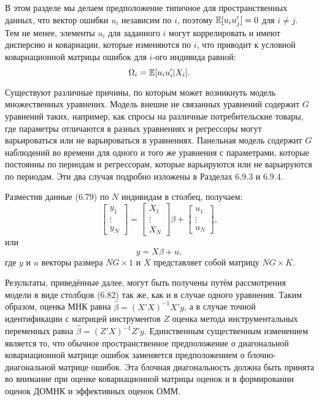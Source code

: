В этом разделе мы делаем предположение типичное для пространственных данных, что вектор ошибки $u_i$ независим по $i$, поэтому $\mathbb{E}[u_i u'_j]=0$ для $i \not = j$. Тем не менее, элементы $u_i$ для заданного $i$ могут коррелировать и имеют дисперсию и ковариации, которые изменяются по $i$, что приводит к условной ковариационной матрицы ошибок для $i$-ого индивида равной:
\begin{equation}
\Omega_i=\mathbb{E}[u_i u'_i|X_i].
\end{equation}

Существуют различные причины, по которым может возникнуть модель множественных уравнених. Модель внешне не связанных уравнений содержит $G$ уравнений таких, например, как спросы на различные потребительские товары, где параметры отличаются в разных уравнениях и регрессоры могут варьироваться или не варьироваться в уравнениях. Панельная модель содержит $G$ наблюдений во времени для одного и того же уравнения с параметрами, которые постоянны по периодам и регрессорам, которые варьируются или не варьируются по периодам. Эти два случая подробно изложены в Разделах 6.9.3 и 6.9.4.

Разместив данные (6.79)  по $N$ индивидам в столбец, получаем:
\begin{equation}
\begin{bmatrix} y_1 \\  \vdots \\ y_N \end{bmatrix} = \begin{bmatrix} X_1 \\  \vdots \\ X_N \end{bmatrix} \beta + \begin{bmatrix} u_1 \\  \vdots \\ u_N \end{bmatrix},
\end{equation}
или
\begin{equation}
y=X \beta + u,
\end{equation}
где $y$ и $u$ векторы размера $NG \times 1$ и $X$ представляет собой матрицу $NG \times K$.

Результаты, приведённые далее, могут быть получены путём рассмотрения модели в виде столбцов
(6.82) так же, как и в случае одного уравнения. Таким образом, оценка МНК равна $\hat{\beta}=(X'X)^{-1}X'y$, а в случае точной идентификации с матрицей инструментов $Z$ оценка метода инструментальных переменных равна $\hat{\beta}=(Z'X)^{-1}Z'y$. Единственным существенным изменением является то, что обычное пространственное предположение о диагональной ковариационной матрице ошибок заменяется предположением о блочно-диагональной матрице ошибок. Эта блочная диагональность должна быть принята во внимание при оценке ковариационной матрицы оценок и в формировании оценок ДОМНК и эффективных оценок ОММ.


